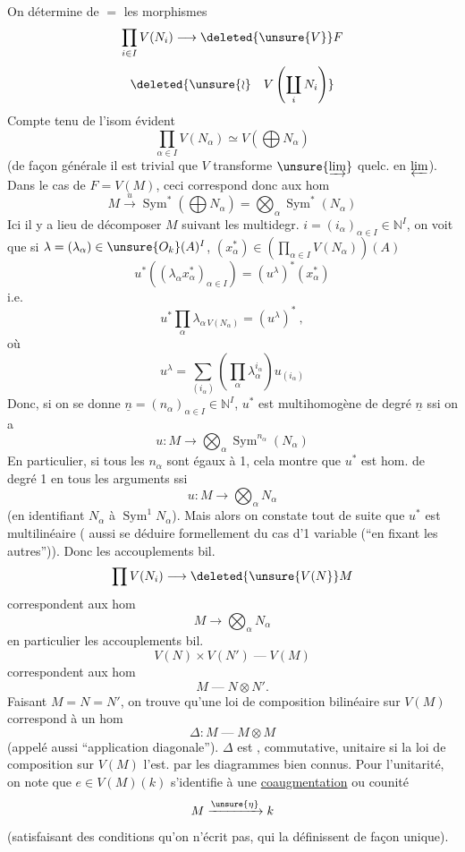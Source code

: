 On détermine de $=$ les morphismes
\[
\prod_{i\in I}V(N_i)\longrightarrow\deleted{\unsure{V}}F
\]
\[
\deleted{\unsure{\wr}\quad V\left(\coprod_iN_i\right)}
\]
Compte tenu de l'isom évident
\[
\prod_{\alpha\in I}V(N_\alpha)\simeq V\left(\bigoplus N_\alpha\right)
\]
(de façon générale il est trivial que $V$ transforme $\unsure{\varinjlim}$ quelc. en $\varprojlim$).
Dans le cas de $F=V(M)$, ceci correspond donc aux hom
\[
M\xrightarrow{u}\operatorname{Sym}^*\left(\bigoplus N_\alpha\right)
=\bigotimes_\alpha\operatorname{Sym}^*(N_\alpha)
\]
Ici il y a lieu de décomposer $M$ suivant les multidegr. $i=(i_\alpha)_{\alpha\in I}\in\mathbb{N}^I$,
on voit que si $\lambda=(\lambda_\alpha)\in\unsure{O_k}(A)^I$, $(x_\alpha^*)\in\left(\prod_{\alpha\in I}V(N_\alpha)\right)(A)$
\[
u^*((\lambda_\alpha x_\alpha^*)_{\alpha\in I})=(u^\lambda)^*(x_\alpha^*)
\]
i.e.
\[
u^*\prod_\alpha\lambda_{\alpha\,V(N_\alpha)}=(u^\lambda)^*\ ,
\]
où 
\[
u^\lambda=\sum_{(i_\alpha)}\left(\prod_\alpha\lambda_\alpha^{i_\alpha}\right)u_{(i_\alpha)}
\]
Donc, si on se donne $\underline n=(n_\alpha)_{\alpha\in I}\in\mathbb{N}^I$, $u^*$ est multihomogène de degré $\underline n$ ssi on a
\[
u:M\longrightarrow\bigotimes_\alpha\operatorname{Sym}^{n_\alpha}(N_\alpha)
\]
En particulier, si tous les $n_\alpha$ sont égaux à 1, cela montre que $u^*$ est hom. de degré 1 en tous les arguments ssi
\[
u:M\longrightarrow\bigotimes_\alpha N_\alpha
\]
(en identifiant $N_\alpha$ à $\operatorname{Sym}^1N_\alpha$). Mais alors on constate tout de suite que $u^*$ est \inserted{$=$} multilinéaire ( aussi se déduire formellement du cas d'1 variable (``en fixant les autres'')). Donc les accouplements bil.
\[
\prod V(N_i)\longrightarrow\deleted{\unsure{V(N}}M
\]
correspondent aux hom
\[
M\longrightarrow\bigotimes_\alpha N_\alpha
\]
en particulier les accouplements bil.
\[
V(N)\times V(N')\mathbin{\text{---}}V(M)
\]
correspondent aux hom
\[
M\mathbin{\text{---}}N\otimes N'.
\]
Faisant $M=N=N'$, on trouve qu'une loi de composition bilinéaire sur $V(M)$ correspond à un hom
\[
\Delta:M\mathbin{\text{---}}M\otimes M
\]
(appelé aussi ``application diagonale''). 
$\Delta$ est ,  commutative,  unitaire si la loi de composition sur $V(M)$ l'est.
  par les diagrammes bien connus. Pour l'unitarité, on note que $e\in V(M)(k)$ s'identifie à une \uline{coaugmentation} ou counité
\[
M\xrightarrow{\unsure{\eta}}k
\]
(satisfaisant des conditions qu'on n'écrit pas, qui la définissent de façon unique).

